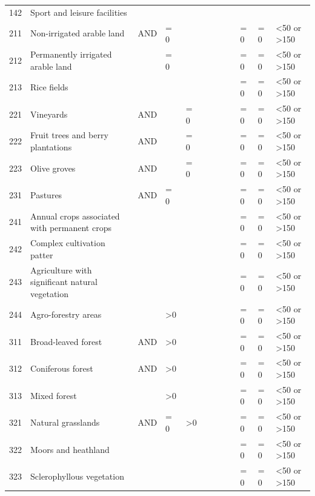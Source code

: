 \begin{table}[!hbt]
{\begin{tabular}{@{}lll|llllll|lll@{}}
    142 & Sport and leisure facilities &  &  &  &  &  &  &  &  &  &  \\
    211 & Non-irrigated arable land & AND & = 0 &  &  &  &  &  & = 0 & = 0 & \textless{}50 or \textgreater 150 \\
    212 & Permanently irrigated arable land &  & = 0 &  &  &  &  &  & = 0 & = 0 & \textless{}50 or \textgreater 150 \\
    213 & Rice fields &  &  &  &  &  &  &  & = 0 & = 0 & \textless{}50 or \textgreater 150 \\
    221 & Vineyards & AND &  & = 0 &  &  &  &  & = 0 & = 0 & \textless{}50 or \textgreater 150 \\
    222 & Fruit trees and berry plantations & AND &  & = 0 &  &  &  &  & = 0 & = 0 & \textless{}50 or \textgreater 150 \\
    223 & Olive groves & AND &  & = 0 &  &  &  &  & = 0 & = 0 & \textless{}50 or \textgreater 150 \\
    231 & Pastures & AND & = 0 &  &  &  &  &  & = 0 & = 0 & \textless{}50 or \textgreater 150 \\
    241 & Annual crops associated with permanent crops &  &  &  &  &  &  &  & = 0 & = 0 & \textless{}50 or \textgreater 150 \\
    242 & Complex cultivation patter &  &  &  &  &  &  &  & = 0 & = 0 & \textless{}50 or \textgreater 150 \\
    243 & Agriculture with significant natural vegetation &  &  &  &  &  &  &  & = 0 & = 0 & \textless{}50 or \textgreater 150 \\
    244 & Agro-forestry areas &  & \textgreater{}0 &  &  &  &  &  & = 0 & = 0 & \textless{}50 or \textgreater 150 \\
    311 & Broad-leaved forest & AND & \textgreater{}0 &  &  &  &  &  & = 0 & = 0 & \textless{}50 or \textgreater 150 \\
    312 & Coniferous forest & AND & \textgreater{}0 &  &  &  &  &  & = 0 & = 0 & \textless{}50 or \textgreater 150 \\
    313 & Mixed forest &  & \textgreater{}0 &  &  &  &  &  & = 0 & = 0 & \textless{}50 or \textgreater 150 \\
    321 & Natural grasslands & AND & = 0 & \textgreater{}0 &  &  &  &  & = 0 & = 0 & \textless{}50 or \textgreater 150 \\
    322 & Moors and heathland &  &  &  &  &  &  &  & = 0 & = 0 & \textless{}50 or \textgreater 150 \\
    323 & Sclerophyllous vegetation &  &  &  &  &  &  &  & = 0 & = 0 & \textless{}50 or \textgreater 150 \\

\end{tabular}}
\end{table}
